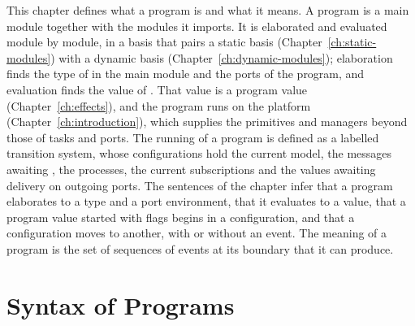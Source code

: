 This chapter defines what a program is and what it means. A program is a
main module together with the modules it imports. It is elaborated and
evaluated module by module, in a basis that pairs a static basis
(Chapter~\ref{ch:static-modules}) with a dynamic basis
(Chapter~\ref{ch:dynamic-modules}); elaboration finds the type of  in
the main module and the ports of the program, and evaluation finds the value
of . That value is a program value (Chapter~\ref{ch:effects}), and the
program runs on the platform (Chapter~\ref{ch:introduction}), which supplies
the primitives and managers beyond those of tasks and ports. %
The running of a program is defined as a labelled transition system, whose
configurations hold the current model, the messages awaiting , the
processes, the current subscriptions and the values awaiting delivery on
outgoing ports. The sentences of the chapter infer that a program elaborates
to a type and a port environment, that it evaluates to a value, that a program
value started with flags begins in a configuration, and that a configuration
moves to another, with or without an event. The meaning of a program is the
set of sequences of events at its boundary that it can produce. %

\section{Syntax of Programs}\label{sec:programs-syntax}

